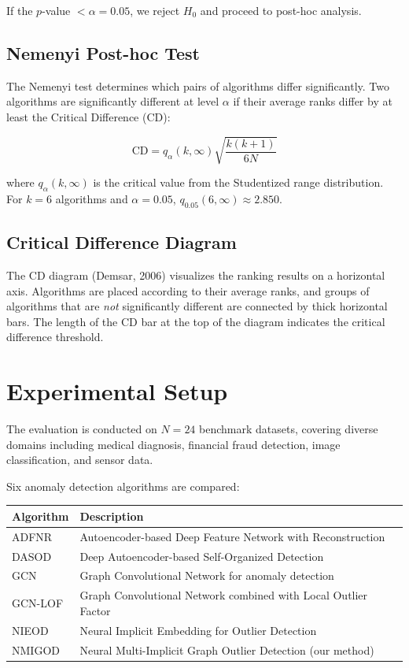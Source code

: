 \documentclass[11pt,a4paper]{article}
\begin{document}
If the $p$-value $< \alpha = 0.05$, we reject $H_0$ and proceed to post-hoc analysis.

\subsection{Nemenyi Post-hoc Test}

The Nemenyi test determines which pairs of algorithms differ significantly.
Two algorithms are significantly different at level $\alpha$ if their average
ranks differ by at least the Critical Difference (CD):

\begin{equation}
\mathrm{CD} = q_{\alpha}(k, \infty) \sqrt{\frac{k(k+1)}{6N}}
\end{equation}

where $q_{\alpha}(k, \infty)$ is the critical value from the Studentized range
distribution. For $k = 6$ algorithms and $\alpha = 0.05$,
$q_{0.05}(6, \infty) \approx 2.850$.

\subsection{Critical Difference Diagram}

The CD diagram (Demsar, 2006) visualizes the ranking results on a horizontal axis.
Algorithms are placed according to their average ranks, and groups of algorithms
that are \emph{not} significantly different are connected by thick horizontal bars.
The length of the CD bar at the top of the diagram indicates the critical
difference threshold.

\section{Experimental Setup}

The evaluation is conducted on $N = 24$ benchmark datasets, covering diverse
domains including medical diagnosis, financial fraud detection, image
classification, and sensor data.

Six anomaly detection algorithms are compared:

\begin{center}
\begin{tabular}{ll}
\toprule
\textbf{Algorithm} & \textbf{Description} \\
\midrule
ADFNR   & Autoencoder-based Deep Feature Network with Reconstruction \\
DASOD   & Deep Autoencoder-based Self-Organized Detection \\
GCN     & Graph Convolutional Network for anomaly detection \\
GCN-LOF & Graph Convolutional Network combined with Local Outlier Factor \\
NIEOD   & Neural Implicit Embedding for Outlier Detection \\
NMIGOD  & Neural Multi-Implicit Graph Outlier Detection (our method) \\
\bottomrule
\end{tabular}
\end{center}
\end{document}
